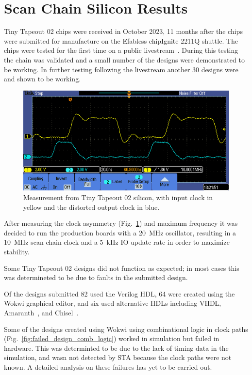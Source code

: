 \section{Scan Chain Silicon Results}
\label{sec:scan_chain_res}

Tiny Tapeout 02 chips were received in October 2023, 11 months after the chips were submitted for manufacture on the Efabless chipIgnite 2211Q shuttle.
The chips were tested for the first time on a public livestream~\cite{siliconalive}.
During this testing the chain was validated and a small number of the designs were demonstrated to be working.
In further testing following the livestream another 30 designs were and shown to be working.

\begin{figure}[!t]
\centering
\includegraphics[width=\columnwidth]{./Figs/tt02_clock_out.png}
\caption{Measurement from Tiny Tapeout 02 silicon, with input clock in yellow and the distorted output clock in blue.}
\label{fig:TT02_clock_out}
\end{figure}

After measuring the clock asymmetry (Fig.~\ref{fig:TT02_clock_out}) and maximum frequency it was decided to run the production boards with a \qty{20}{\MHz} oscillator, resulting in a \qty{10}{\MHz} scan chain clock and a \qty{5}{\kHz} IO update rate in order to maximize stability.

Some Tiny Tapeout 02 designs did not function as expected; in most cases this was determineted to be due to faults in the submitted design.

Of the designs submitted 82 used the Verilog HDL, 64 were created using the Wokwi graphical editor, and six used alternative HDLs including VHDL, Amaranth~\cite{amaranth}, and Chisel~\cite{chisel}.

Some of the designs created using Wokwi using combinational logic in clock paths (Fig.~\ref{fig:failed_design_comb_logic}) worked in simulation but failed in hardware.
This was determinted to be due to the lack of timing data in the simulation, and wasn not detected by STA because the clock paths were not known. A detailed analysis on these failures has yet to be carried out.

